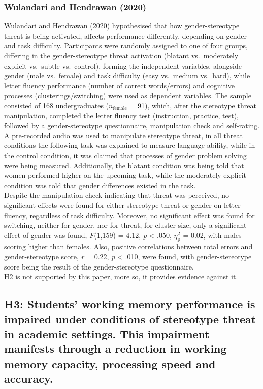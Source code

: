 \documentclass[
  stu,floatsintext]{apa7}
\begin{document}
\subsubsection{Wulandari and Hendrawan (2020)}\label{wulandaritrustyourabilities2020}

Wulandari and Hendrawan (2020) hypothesised that how gender-stereotype threat is being activated, affects performance differently, depending on gender and task difficulty.
Participants were randomly assigned to one of four groups, differing in the gender-stereotype threat activation (blatant vs.~moderately explicit vs.~subtle vs.~control), forming the independent variables, alongside gender (male vs.~female) and task difficulty (easy vs.~medium vs.~hard), while letter fluency performance (number of correct words/errors) and cognitive processes (clusterings/switching) were used as dependent variables.
The sample consisted of 168 undergraduates (\(n_{\text{female}}\) = 91), which, after the stereotype threat manipulation, completed the letter fluency test (instruction, practice, test), followed by a gender-stereotype questionnaire, manipulation check and self-rating.
A pre-recorded audio was used to manipulate stereotype threat, in all threat conditions the following task was explained to measure language ability, while in the control condition, it was claimed that processes of gender problem solving were being measured.
Additionally, the blatant condition was being told that women performed higher on the upcoming task, while the moderately explicit condition was told that gender differences existed in the task.\\
Despite the manipulation check indicating that threat was perceived, no significant effects were found for either stereotype threat or gender on letter fluency, regardless of task difficulty.
Moreover, no significant effect was found for switching, neither for gender, nor for threat, for cluster size, only a significant effect of gender was found, \emph{F}(1,159) = 4.12, \emph{p} \textless{} .050, \(\eta^{2}_{\text{p}}\) = 0.02, with males scoring higher than females.
Also, positive correlations between total errors and gender-stereotype score, \emph{r} = 0.22, \emph{p} \textless{} .010, were found, with gender-stereotype score being the result of the gender-stereotype questionnaire.\\
H2 is not supported by this paper, more so, it provides evidence against it.

\subsection{H3: Students' working memory performance is impaired under conditions of stereotype threat in academic settings. This impairment manifests through a reduction in working memory capacity, processing speed and accuracy.}\label{h3-students-working-memory-performance-is-impaired-under-conditions-of-stereotype-threat-in-academic-settings.-this-impairment-manifests-through-a-reduction-in-working-memory-capacity-processing-speed-and-accuracy.}
\end{document}
